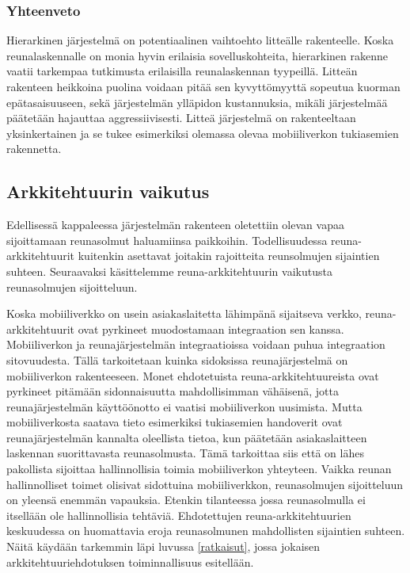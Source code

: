 \subsubsection{Yhteenveto}
Hierarkinen järjestelmä on potentiaalinen vaihtoehto litteälle rakenteelle. Koska reunalaskennalle on monia hyvin erilaisia sovelluskohteita, hierarkinen rakenne vaatii tarkempaa tutkimusta erilaisilla reunalaskennan tyypeillä. Litteän rakenteen heikkoina puolina voidaan pitää sen kyvyttömyyttä sopeutua kuorman epätasaisuuseen, sekä järjestelmän ylläpidon kustannuksia, mikäli järjestelmää päätetään hajauttaa aggressiivisesti. Litteä järjestelmä on rakenteeltaan yksinkertainen ja se tukee esimerkiksi olemassa olevaa mobiiliverkon tukiasemien rakennetta. 


\subsection{Arkkitehtuurin vaikutus}
Edellisessä kappaleessa järjestelmän rakenteen oletettiin olevan vapaa sijoittamaan reunasolmut haluamiinsa paikkoihin. 
Todellisuudessa reuna-arkkitehtuurit kuitenkin asettavat joitakin rajoitteita reunsolmujen sijaintien suhteen. Seuraavaksi käsittelemme reuna-arkkitehtuurin vaikutusta reunasolmujen sijoitteluun.

Koska mobiiliverkko on usein asiakaslaitetta lähimpänä sijaitseva verkko, reuna-arkkitehtuurit ovat pyrkineet muodostamaan integraation sen kanssa.
Mobiiliverkon ja reunajärjestelmän integraatioissa voidaan puhua integraation sitovuudesta. 
Tällä tarkoitetaan kuinka sidoksissa reunajärjestelmä on mobiiliverkon rakenteeseen.
Monet ehdotetuista reuna-arkkitehtuureista ovat pyrkineet pitämään sidonnaisuutta mahdollisimman vähäisenä, jotta reunajärjestelmän käyttöönotto ei vaatisi mobiiliverkon uusimista.
Mutta mobiiliverkosta saatava tieto esimerkiksi tukiasemien handoverit ovat reunajärjestelmän kannalta oleellista tietoa, kun päätetään asiakaslaitteen laskennan suorittavasta reunasolmusta.
Tämä tarkoittaa siis että on lähes pakollista sijoittaa hallinnollisia toimia mobiiliverkon yhteyteen.
Vaikka reunan hallinnolliset toimet olisivat sidottuina mobiiliverkkon, reunasolmujen sijoitteluun on yleensä enemmän vapauksia. Etenkin tilanteessa jossa reunasolmulla ei itsellään ole hallinnollisia tehtäviä.
Ehdotettujen reuna-arkkitehtuurien keskuudessa on huomattavia eroja reunasolmunen mahdollisten sijaintien suhteen. Näitä käydään tarkemmin läpi luvussa \ref{ratkaisut}, jossa jokaisen arkkitehtuuriehdotuksen toiminnallisuus esitellään. 

